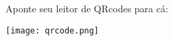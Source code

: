 \documentclass{article}
\begin{document}
\begin{center}

\Huge{Aponte seu leitor de QRcodes para cá:}

\texttt{[image: qrcode.png]}

\end{center}
\end{document}
